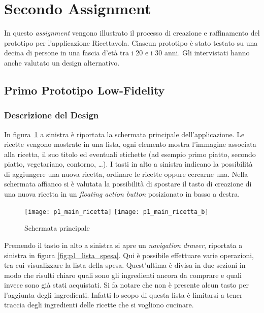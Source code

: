 
\section{Secondo Assignment}
In questo \textit{assignment} vengono illustrato il processo di creazione e raffinamento del prototipo per l'applicazione Ricettavola.
Ciascun prototipo è stato testato su una decina di persone in una fascia d'età tra i 20 e i 30 anni.
Gli intervistati hanno anche valutato un design alternativo.


\subsection{Primo Prototipo Low-Fidelity}

\subsubsection{Descrizione del Design}

In figura~\ref{fig:p1_main} a sinistra è riportata la schermata principale dell'applicazione.
Le ricette vengono mostrate in una lista, ogni elemento mostra l'immagine associata alla ricetta, il suo titolo ed eventuali etichette (ad esempio primo piatto, secondo piatto, vegetariano, contorno, \dots ).
I tasti in alto a sinistra indicano la possibilità di aggiungere una nuova ricetta, ordinare le ricette oppure cercarne una.
Nella schermata affianco si è valutata la possibilità di spostare il tasto di creazione di una nuova ricetta in un \textit{floating action button} posizionato in basso a destra.



\begin{figure}[ht]
  \begin{center}
    \texttt{[image: p1\_main\_ricetta]}
    \texttt{[image: p1\_main\_ricetta\_b]}
    \caption{Schermata principale}
    \label{fig:p1_main}
  \end{center}
\end{figure}

\clearpage
Premendo il tasto in alto a sinistra si apre un \textit{navigation drawer}, riportata a sinistra in figura \ref{fig:p1_lista_spesa}.
Qui è possibile effettuare varie operazioni, tra cui visualizzare la lista della spesa.
Quest'ultima è divisa in due sezioni in modo che risulti chiaro quali sono gli ingredienti ancora da comprare e quali invece sono già stati acquistati.
Si fa notare che non è presente alcun tasto per l'aggiunta degli ingredienti.
Infatti lo scopo di questa lista è limitarsi a tener traccia degli ingredienti delle ricette che si vogliono cucinare.

